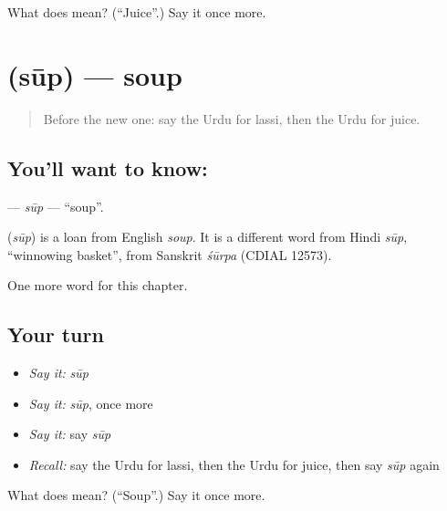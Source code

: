 \begin{tcolorbox}[breakable,colback=teal!4,colframe=teal!35!black,title={Before you move on}]
What does  mean? (\textquotedblleft{}Juice\textquotedblright{}.) Say it once more.
\end{tcolorbox}
\section[\texorpdfstring{\ur{سوپ} (sūp)}{سوپ (sūp)}]{ (sūp) — soup}

\label{lesson:UR-C119-sup}



\begin{quote}
Before the new one: say the Urdu for lassi, then the Urdu for juice.
\end{quote}

\subsection*{You'll want to know: }
\textbf{} — \emph{sūp} — \textquotedblleft{}soup\textquotedblright{}.

\begin{cousinweb}
\textbf{} (\emph{sūp}) is a loan from English \emph{soup}. It is a different word from Hindi \emph{sūp}, \textquotedblleft{}winnowing basket\textquotedblright{}, from Sanskrit \emph{śūrpa} (CDIAL 12573).
\end{cousinweb}

\begin{grammarlens}[title={What you've built}]
One more word for this chapter.
\end{grammarlens}

\subsection*{Your turn}
\begin{itemize}
\raggedright
  \item \emph{Say it:} \emph{sūp}
  \item \emph{Say it:} \emph{sūp}, once more
  \item \emph{Say it:} say \emph{sūp}
  \item \emph{Recall:} say the Urdu for lassi, then the Urdu for juice, then say \emph{sūp} again
\end{itemize}

\begin{tcolorbox}[breakable,colback=teal!4,colframe=teal!35!black,title={Before you move on}]
What does  mean? (\textquotedblleft{}Soup\textquotedblright{}.) Say it once more.
\end{tcolorbox}
